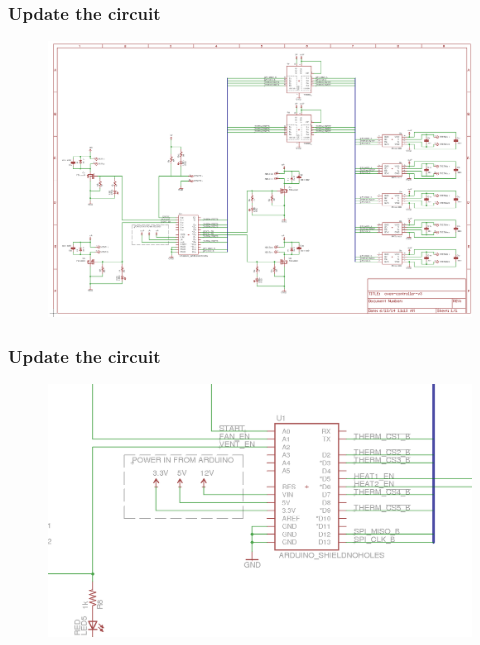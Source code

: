 \documentclass{beamer}
\begin{document}

\begin{frame}
\frametitle{Update the circuit}
\begin{figure}
\includegraphics[width=1.0\linewidth]{v3sch.png}
\end{figure}
\end{frame}


\begin{frame}
\frametitle{Update the circuit}
\begin{figure}
\includegraphics[width=1.0\linewidth]{sch-good.png}
\end{figure}
\end{frame}

\end{document}
